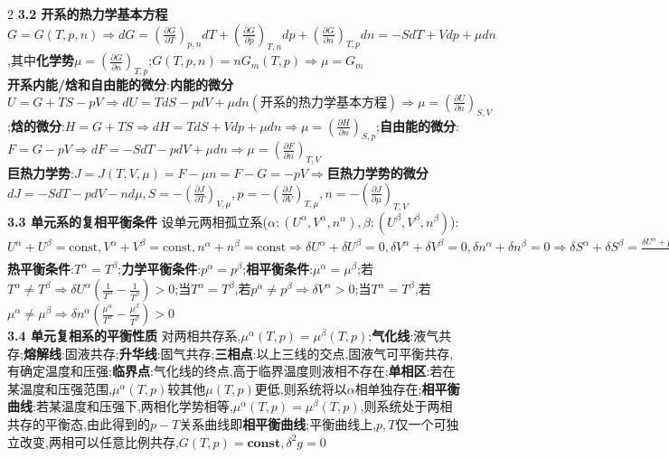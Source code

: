 \documentclass[10pt,a4paper]{article}
\begin{document}
\begin{multicols}{2}
\textbf{3.2 开系的热力学基本方程}\quad
$G=G(T,p,n)\Rightarrow dG=\left(\frac{\partial G}{\partial T}\right)_{p,n}dT+\left(\frac{\partial G}{\partial p}\right)_{T,n}dp+\left(\frac{\partial G}{\partial n}\right)_{T,p}dn=-SdT+Vdp+\mu dn$,其中\textbf{化学势}$\mu=\left(\frac{\partial G}{\partial n}\right)_{T,p}$;$G(T,p,n)=nG_m(T,p)\Rightarrow\mu=G_m$\\
\textbf{开系内能/焓和自由能的微分}:\textbf{内能的微分}$U=G+TS-pV\Rightarrow dU=TdS-pdV+\mu dn(\textbf{开系的热力学基本方程})\Rightarrow\mu=\left(\frac{\partial U}{\partial n}\right)_{S,V}$;\textbf{焓的微分}:$H=G+TS\Rightarrow dH=TdS+Vdp+\mu dn\Rightarrow\mu=\left(\frac{\partial H}{\partial n}\right)_{S,p}$;\textbf{自由能的微分}:$F=G-pV\Rightarrow dF=-SdT-pdV+\mu dn\Rightarrow\mu=\left(\frac{\partial F}{\partial n}\right)_{T,V}$\\
\textbf{巨热力学势}:$J=J(T,V,\mu)=F-\mu n=F-G=-pV\Rightarrow$\textbf{巨热力学势的微分}$dJ=-SdT-pdV-nd\mu,S=-\left(\frac{\partial J}{\partial T}\right)_{V,\mu},p=-\left(\frac{\partial J}{\partial V}\right)_{T,\mu},n=-\left(\frac{\partial J}{\partial\mu}\right)_{T,V}$\\
\textbf{3.3 单元系的复相平衡条件}
设单元两相孤立系($\alpha:(U^{\alpha},V^{\alpha},n^{\alpha}),\beta:(U^{\beta},V^{\beta},n^{\beta})$):$U^{\alpha}+U^{\beta}=\text{const},V^{\alpha}+V^{\beta}=\text{const},n^{\alpha}+n^{\beta}=\text{const}\Rightarrow\delta U^{\alpha}+\delta U^{\beta}=0,\delta V^{\alpha}+\delta V^{\beta}=0,\delta n^{\alpha}+\delta n^{\beta}=0\Rightarrow\delta S^{\alpha}+\delta S^{\beta}=\frac{\delta U^{\alpha}+p^{\alpha}\delta V^{\alpha}-\mu^{\alpha}\delta n^{\alpha}}{T^{\alpha}}+\frac{\delta U^{\beta}+p^{\beta}\delta V^{\beta}-\mu^{\beta}\delta n^{\beta}}{T^{\beta}}=\delta U^{\alpha}\left(\frac{1}{T^{\alpha}}-\frac{1}{T^{\beta}}\right)+\delta V^{\alpha}\left(\frac{p^{\alpha}}{T^{\alpha}}-\frac{p^{\beta}}{T^{\beta}}\right)-\delta n^{\alpha}\left(\frac{\mu^{\alpha}}{T^{\alpha}}-\frac{\mu^{\beta}}{T^{\beta}}\right)=0\Rightarrow$\textbf{热平衡条件}:$T^{\alpha}=T^{\beta}$;\textbf{力学平衡条件}:$p^{\alpha}=p^{\beta}$;\textbf{相平衡条件}:$\mu^{\alpha}=\mu^{\beta}$;若$T^{\alpha}\neq T^{\beta}\Rightarrow\delta U^{\alpha}\left(\frac{1}{T^{\alpha}}-\frac{1}{T^{\beta}}\right)>0$;当$T^{\alpha}=T^{\beta}$,若$p^{\alpha}\neq p^{\beta}\Rightarrow\delta V^{\alpha}>0$;当$T^{\alpha}=T^{\beta}$,若$\mu^{\alpha}\neq\mu^{\beta}\Rightarrow\delta n^{\alpha}\left(\frac{\mu^{\alpha}}{T^{\alpha}}-\frac{\mu^{\beta}}{T^{\beta}}\right)>0$\\
\textbf{3.4 单元复相系的平衡性质}
对两相共存系,$\mu^{\alpha}(T,p)=\mu^{\beta}(T,p)$;\textbf{气化线}:液气共存;\textbf{熔解线}:固液共存;\textbf{升华线}:固气共存;\textbf{三相点}:以上三线的交点,固液气可平衡共存,有确定温度和压强;\textbf{临界点}:气化线的终点,高于临界温度则液相不存在;\textbf{单相区}:若在某温度和压强范围,$\mu^{\alpha}(T,p)$较其他$\mu(T,p)$更低,则系统将以$\alpha$相单独存在;\textbf{相平衡曲线}:若某温度和压强下,两相化学势相等,$\mu^{\alpha}(T,p)=\mu^{\beta}(T,p)$,则系统处于两相共存的平衡态,由此得到的$p-T$关系曲线即\textbf{相平衡曲线};平衡曲线上,$p,T$仅一个可独立改变,两相可以任意比例共存,$G(T,p)=\textbf{const},\delta^2g=0$\\

\end{multicols}
\end{document}
